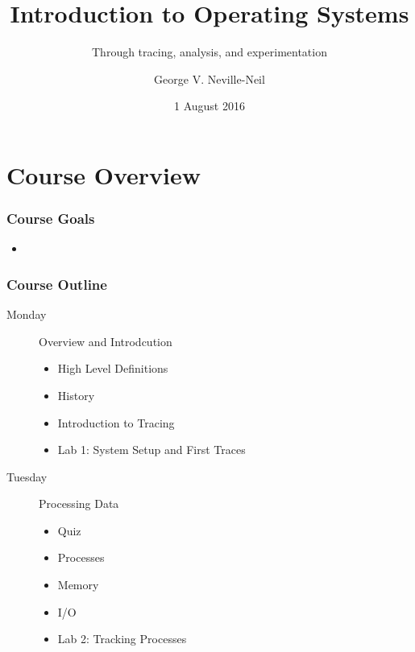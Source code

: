 \documentclass[pdftex]{beamer} %
\begin{document}

\title{Introduction to Operating Systems}
\subtitle{Through tracing, analysis, and experimentation}
\author{George V. Neville-Neil}
\date{1 August 2016}

\begin{frame}
  \titlepage
\end{frame}

\section{Course Overview}

\begin{frame}
  \frametitle{Course Goals}
  \begin{itemize}
  \item 
  \end{itemize}
\end{frame}

\begin{frame}
  \frametitle{Course Outline}
  \begin{description}
  \item[Monday] Overview and Introdcution
    \begin{itemize}
    \item High Level Definitions
    \item History
    \item Introduction to Tracing
    \item Lab 1: System Setup and First Traces
    \end{itemize}
  \item[Tuesday] Processing Data
    \begin{itemize}
    \item Quiz
    \item Processes 
    \item Memory
    \item I/O
    \item Lab 2: Tracking Processes
    \end{itemize}
  \end{description}
\end{frame}
\end{document}
